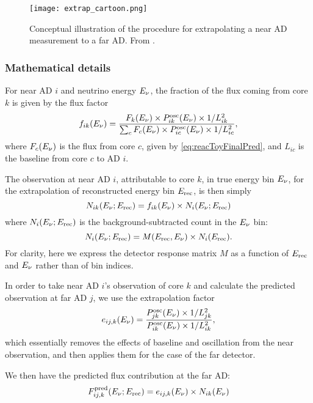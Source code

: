 \documentclass[../thesis.tex]{subfiles}
\begin{document}
\begin{figure}[ht]
  \centering
  \texttt{[image: extrap\_cartoon.png]}
  \caption{Conceptual illustration of the procedure for extrapolating a near AD measurement to a far AD. From \cite{berkeley_shapefit}.}
  \label{fig:fitExtrapCartoon} 
\end{figure}

\subsubsection{Mathematical details}

For near AD $i$ and neutrino energy $E_\mathrm{\nu}$, the fraction of the flux coming from core $k$ is given by the flux factor
\begin{equation}
  \label{eq:fitFluxFactor}
  f_{ik}(E_\mathrm{\nu}) = \frac{F_k(E_\mathrm{\nu}) \times P^{\mathrm{osc}}_{ik}(E_\mathrm{\nu}) \times 1/L^2_{ik}}
  {\sum_c F_c(E_\mathrm{\nu}) \times P^{\mathrm{osc}}_{ic}(E_\mathrm{\nu}) \times 1/L^2_{ic}},
\end{equation}
where $F_c(E_\mathrm{\nu})$ is the flux from core $c$, given by \autoref{eq:reacToyFinalPred}, and $L_{ic}$ is the baseline from core $c$ to AD $i$.

The observation at near AD $i$, attributable to core $k$, in true energy bin $E_\mathrm{\nu}$, for the extrapolation of reconstructed energy bin $E_\mathrm{rec}$, is then simply
\begin{equation}
  N_{ik}(E_\mathrm{\nu}; E_\mathrm{rec}) = f_{ik}(E_\mathrm{\nu}) \times N_i(E_\mathrm{\nu}; E_\mathrm{rec})
\end{equation}
where $N_i(E_\mathrm{\nu}; E_\mathrm{rec})$ is the background-subtracted count in the $E_\mathrm{\nu}$ bin:
\begin{equation}
  N_i(E_\mathrm{\nu}; E_\mathrm{rec}) = M(E_\mathrm{rec}, E_\mathrm{\nu}) \times N_i(E_\mathrm{rec}).
\end{equation}
For clarity, here we express the detector response matrix $M$ as a function of $E_\mathrm{rec}$ and $E_\mathrm{\nu}$ rather than of bin indices.

In order to take near AD $i$'s observation of core $k$ and calculate the predicted observation at far AD $j$, we use the extrapolation factor
\begin{equation}
  \label{eq:fitExtrapFactor}
  e_{ij,k}(E_\mathrm{\nu}) = \frac{P^{\mathrm{osc}}_{jk}(E_\mathrm{\nu}) \times 1/L^2_{jk}}
  {P^{\mathrm{osc}}_{ik}(E_\mathrm{\nu}) \times 1/L^2_{ik}},
\end{equation}
which essentially removes the effects of baseline and oscillation from the near observation, and then applies them for the case of the far detector.

We then have the predicted flux contribution at the far AD:
\begin{equation}
  F^{\mathrm{pred}}_{ij,k}(E_\mathrm{\nu}; E_\mathrm{rec}) = e_{ij,k}(E_\mathrm{\nu}) \times N_{ik}(E_\mathrm{\nu})
\end{equation}
\end{document}
